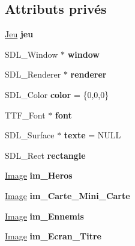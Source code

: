 \subsection*{Attributs privés}
\begin{DoxyCompactItemize}
\item 
\hypertarget{classsdlJeu_a43eec470e1819a9df66e019e02928497}{\hyperlink{classJeu}{Jeu} {\bfseries jeu}}\label{classsdlJeu_a43eec470e1819a9df66e019e02928497}

\item 
\hypertarget{classsdlJeu_a9c6b207c8f9108cc52c570f890f20cba}{S\+D\+L\+\_\+\+Window $\ast$ {\bfseries window}}\label{classsdlJeu_a9c6b207c8f9108cc52c570f890f20cba}

\item 
\hypertarget{classsdlJeu_aee1a517fb83b31bf7b19330d652bd7fe}{S\+D\+L\+\_\+\+Renderer $\ast$ {\bfseries renderer}}\label{classsdlJeu_aee1a517fb83b31bf7b19330d652bd7fe}

\item 
\hypertarget{classsdlJeu_aade87bc75844e56cdf868898d26bbb0e}{S\+D\+L\+\_\+\+Color {\bfseries color} = \{0,0,0\}}\label{classsdlJeu_aade87bc75844e56cdf868898d26bbb0e}

\item 
\hypertarget{classsdlJeu_a08dc87030827cd3f6a861af4ddbaf7fd}{T\+T\+F\+\_\+\+Font $\ast$ {\bfseries font}}\label{classsdlJeu_a08dc87030827cd3f6a861af4ddbaf7fd}

\item 
\hypertarget{classsdlJeu_abf097e5a5cfa2a83a165a49a1ac6e950}{S\+D\+L\+\_\+\+Surface $\ast$ {\bfseries texte} = N\+U\+L\+L}\label{classsdlJeu_abf097e5a5cfa2a83a165a49a1ac6e950}

\item 
\hypertarget{classsdlJeu_a852fa68e5f4b504cb3448b8ab9071eba}{S\+D\+L\+\_\+\+Rect {\bfseries rectangle}}\label{classsdlJeu_a852fa68e5f4b504cb3448b8ab9071eba}

\item 
\hypertarget{classsdlJeu_adcebeced03a496240acf5785e2f52dd3}{\hyperlink{classImage}{Image} {\bfseries im\+\_\+\+Heros}}\label{classsdlJeu_adcebeced03a496240acf5785e2f52dd3}

\item 
\hypertarget{classsdlJeu_a3eafc892cc5f11476c61976c1516a59f}{\hyperlink{classImage}{Image} {\bfseries im\+\_\+\+Carte\+\_\+\+Mini\+\_\+\+Carte}}\label{classsdlJeu_a3eafc892cc5f11476c61976c1516a59f}

\item 
\hypertarget{classsdlJeu_a531541bf7f91365fcedb57ba9a970380}{\hyperlink{classImage}{Image} {\bfseries im\+\_\+\+Ennemis}}\label{classsdlJeu_a531541bf7f91365fcedb57ba9a970380}

\item 
\hypertarget{classsdlJeu_a42cb30775a35c957832195352d8a8895}{\hyperlink{classImage}{Image} {\bfseries im\+\_\+\+Ecran\+\_\+\+Titre}}\label{classsdlJeu_a42cb30775a35c957832195352d8a8895}

\end{DoxyCompactItemize}


